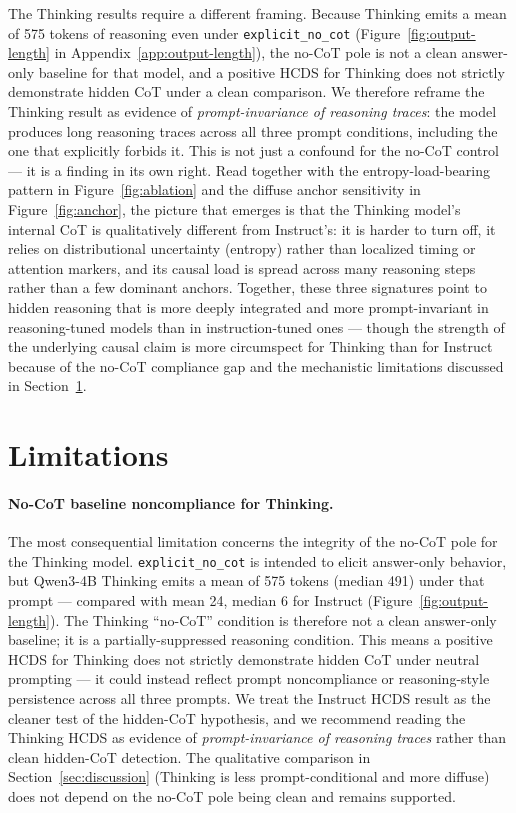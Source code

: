 \documentclass{article}
\theoremstyle{plain}
\theoremstyle{definition}
\theoremstyle{remark}
\begin{document}
The Thinking results require a different framing. Because Thinking emits a mean of 575 tokens of reasoning even under \texttt{explicit\_no\_cot} (Figure~\ref{fig:output-length} in Appendix~\ref{app:output-length}), the no-CoT pole is not a clean answer-only baseline for that model, and a positive HCDS for Thinking does not strictly demonstrate hidden CoT under a clean comparison. We therefore reframe the Thinking result as evidence of \emph{prompt-invariance of reasoning traces}: the model produces long reasoning traces across all three prompt conditions, including the one that explicitly forbids it. This is not just a confound for the no-CoT control --- it is a finding in its own right. Read together with the entropy-load-bearing pattern in Figure~\ref{fig:ablation} and the diffuse anchor sensitivity in Figure~\ref{fig:anchor}, the picture that emerges is that the Thinking model's internal CoT is qualitatively different from Instruct's: it is harder to turn off, it relies on distributional uncertainty (entropy) rather than localized timing or attention markers, and its causal load is spread across many reasoning steps rather than a few dominant anchors. Together, these three signatures point to hidden reasoning that is more deeply integrated and more prompt-invariant in reasoning-tuned models than in instruction-tuned ones --- though the strength of the underlying causal claim is more circumspect for Thinking than for Instruct because of the no-CoT compliance gap and the mechanistic limitations discussed in Section~\ref{sec:limitations}.

\section{Limitations}
\label{sec:limitations}

\paragraph{No-CoT baseline noncompliance for Thinking.}
The most consequential limitation concerns the integrity of the no-CoT pole for the Thinking model. \texttt{explicit\_no\_cot} is intended to elicit answer-only behavior, but Qwen3-4B Thinking emits a mean of 575 tokens (median 491) under that prompt --- compared with mean 24, median 6 for Instruct (Figure~\ref{fig:output-length}). The Thinking ``no-CoT'' condition is therefore not a clean answer-only baseline; it is a partially-suppressed reasoning condition. This means a positive HCDS for Thinking does not strictly demonstrate hidden CoT under neutral prompting --- it could instead reflect prompt noncompliance or reasoning-style persistence across all three prompts. We treat the Instruct HCDS result as the cleaner test of the hidden-CoT hypothesis, and we recommend reading the Thinking HCDS as evidence of \emph{prompt-invariance of reasoning traces} rather than clean hidden-CoT detection. The qualitative comparison in Section~\ref{sec:discussion} (Thinking is less prompt-conditional and more diffuse) does not depend on the no-CoT pole being clean and remains supported.
\end{document}
